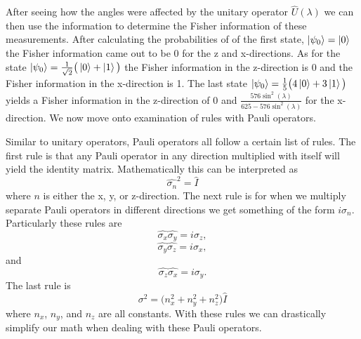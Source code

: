 \documentclass[twocolumn]{article}
\begin{document}
After seeing how the angles were affected by the unitary operator $\hat{U}(\lambda)$ we can then use the information to determine the Fisher information of these measurements. After calculating the probabilities of of the first state, $\ket{\psi_0}=\ket{0}$ the Fisher information came out to be 0 for the z and x-directions. As for the state $\ket{\psi_0}=\frac{1}{\sqrt{2}}\big(\ket{0}+\ket{1}\big)$ the Fisher information in the z-direction is 0 and the Fisher information in the x-direction is 1. The last state $\ket{\psi_0}=\frac{1}{5}\big(4\ket{0}+3\ket{1}\big)$ yields a Fisher information in the z-direction of 0 and $\frac{576\sin^2{(\lambda)}}{625-576\sin^2{(\lambda)}}$ for the x-direction. We now move onto examination of rules with Pauli operators.

Similar to unitary operators, Pauli operators all follow a certain list of rules. The first rule is that any Pauli operator in any direction multiplied with itself will yield the identity matrix. Mathematically this can be interpreted as
\begin{equation}
\hat{\sigma_n}^2=\hat{I}
\end{equation}
where $n$ is either the x, y, or z-direction. The next rule is for when we multiply separate Pauli operators in different directions we get something of the form $i\sigma_n$. Particularly these rules are
\begin{equation}
\hat{\sigma_x}\hat{\sigma_y}=i\sigma_z,
\end{equation}
\begin{equation}
\hat{\sigma_y}\hat{\sigma_z}=i\sigma_x,
\end{equation}
and
\begin{equation}
\hat{\sigma_z}\hat{\sigma_x}=i\sigma_y.
\end{equation}
The last rule is
\begin{equation}
\sigma^2=\big(n_x^2+n_y^2+n_z^2\big)\hat{I}
\end{equation}
where $n_x$, $n_y$, and $n_z$ are all constants. With these rules we can drastically simplify our math when dealing with these Pauli operators.
\end{document}

